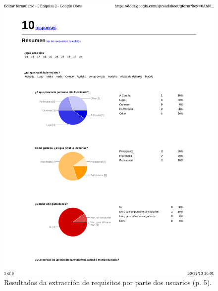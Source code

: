   \begin{figure}[!htbp]
   \centering
   \includegraphics[scale=0.7,page=5,keepaspectratio=true]{./imagenes/enquisa.pdf}
   \caption{Resultados da extracción de requisitos por parte dos usuarios (p. 5).}
   \label{figura:ResultadosExtraccionRequisitosUsuarios5}
  \end{figure}


